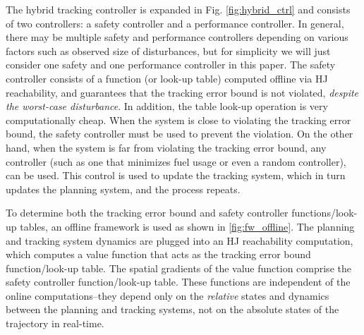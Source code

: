 
The hybrid tracking controller is expanded in Fig. \ref{fig:hybrid_ctrl} and consists of two controllers: a safety controller and a performance controller. In general, there may be multiple safety and performance controllers depending on various factors such as observed size of disturbances, but for simplicity we will just consider one safety and one performance controller in this paper. The safety controller consists of a function (or look-up table) computed offline via HJ reachability, and guarantees that the tracking error bound is not violated, \textit{despite the worst-case disturbance}. In addition, the table look-up operation is very computationally cheap. When the system is close to violating the tracking error bound, the safety controller must be used to prevent the violation. On the other hand, when the system is far from violating the tracking error bound, any controller (such as one that minimizes fuel usage or even a random controller), can be used. This control is used to update the tracking system, which in turn updates the planning system, and the process repeats.

To determine both the tracking error bound and safety controller functions/look-up tables, an offline framework is used as shown in \ref{fig:fw_offline}. The planning and tracking system dynamics are plugged into an HJ reachability computation, which computes a value function that acts as the tracking error bound function/look-up table. The spatial gradients of the value function comprise the safety controller function/look-up table. These functions are independent of the online computations--they depend only on the \textit{relative} states and dynamics between the planning and tracking systems, not on the absolute states of the trajectory in real-time.

